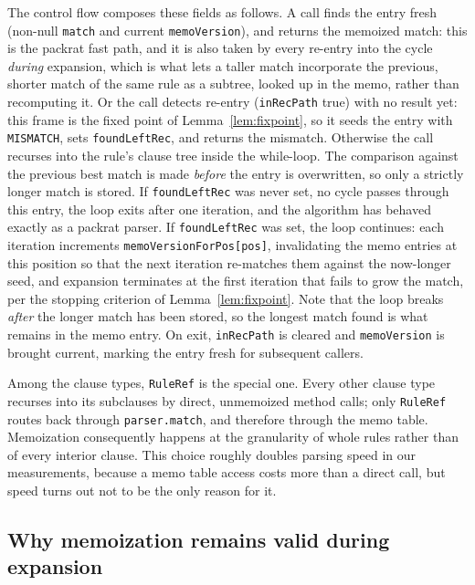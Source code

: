 \documentclass[manuscript]{acmart}
\newcommand{\cd}[1]{\texttt{#1}}
\begin{document}
The control flow composes these fields as follows. A call finds the entry fresh (non-null \cd{match} and current \cd{memoVersion}), and returns the memoized match: this is the packrat fast path, and it is also taken by every re-entry into the cycle \emph{during} expansion, which is what lets a taller match incorporate the previous, shorter match of the same rule as a subtree, looked up in the memo, rather than recomputing it. Or the call detects re-entry (\cd{inRecPath} true) with no result yet: this frame is the fixed point of Lemma~\ref{lem:fixpoint}, so it seeds the entry with \cd{MISMATCH}, sets \cd{foundLeftRec}, and returns the mismatch. Otherwise the call recurses into the rule's clause tree inside the while-loop. The comparison against the previous best match is made \emph{before} the entry is overwritten, so only a strictly longer match is stored. If \cd{foundLeftRec} was never set, no cycle passes through this entry, the loop exits after one iteration, and the algorithm has behaved exactly as a packrat parser. If \cd{foundLeftRec} was set, the loop continues: each iteration increments \cd{memoVersionForPos[pos]}, invalidating the memo entries at this position so that the next iteration re-matches them against the now-longer seed, and expansion terminates at the first iteration that fails to grow the match, per the stopping criterion of Lemma~\ref{lem:fixpoint}. Note that the loop breaks \emph{after} the longer match has been stored, so the longest match found is what remains in the memo entry. On exit, \cd{inRecPath} is cleared and \cd{memoVersion} is brought current, marking the entry fresh for subsequent callers.

Among the clause types, \cd{RuleRef} is the special one. Every other clause type recurses into its subclauses by direct, unmemoized method calls; only \cd{RuleRef} routes back through \cd{parser.match}, and therefore through the memo table. Memoization consequently happens at the granularity of whole rules rather than of every interior clause. This choice roughly doubles parsing speed in our measurements, because a memo table access costs more than a direct call, but speed turns out not to be the only reason for it.

\subsection{Why memoization remains valid during expansion}
\label{sec:purity}
\end{document}
